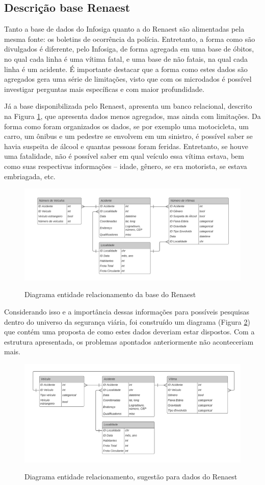 \clearpage
\subsection{Descrição base Renaest}
\label{anx:infosiga}

Tanto a base de dados do Infosiga quanto a do Renaest são alimentadas pela mesma fonte: os boletins de ocorrência da polícia. Entretanto, a forma como são divulgados é diferente, pelo Infosiga, de forma agregada em uma base de óbitos, no qual cada linha é uma vítima fatal, e uma base de não fatais, na qual cada linha é um acidente. É importante destacar que a forma como estes dados são agregados gera uma série de limitações, visto que com os microdados é possível investigar perguntas mais específicas e com maior profundidade.

Já a base disponibilizada pelo Renaest, apresenta um banco relacional, descrito na Figura \ref{fig:DERRenaest}, que apresenta dados menos agregados, mas ainda com limitações. Da forma como foram organizados os dados, se por exemplo uma motocicleta, um carro, um ônibus e um pedestre se envolvem em um sinistro, é possível saber se havia suspeita de álcool e quantas pessoas foram feridas. Entretanto, se houve uma fatalidade, não é possível saber em qual veículo essa vítima estava, bem como suas respectivas informações -- idade, gênero, se era motorista, se estava embriagada, etc. 

\begin{figure}[h]
    \centering
    \caption{Diagrama entidade relacionamento da base do Renaest}
    \includegraphics[width = 1\linewidth]{relatorios/faixa-azul/figuras/diagrama_base.png}
    \label{fig:DERRenaest}
\end{figure}

Considerando isso e a importância dessas informações para possíveis pesquisas dentro do universo da segurança viária, foi construído um diagrama (Figura \ref{fig:DERSug}) que contém uma proposta de como estes dados deveriam estar dispostos. Com a estrutura apresentada, os problemas apontados anteriormente não aconteceriam mais.

\begin{figure}[h]
    \centering
    \caption{Diagrama entidade relacionamento, sugestão para dados do Renaest}
    \includegraphics[width = 1\linewidth]{relatorios/faixa-azul/figuras/diagrama_sugestao.png}
    \label{fig:DERSug}
\end{figure}